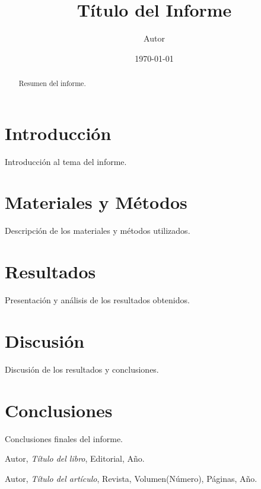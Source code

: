 \documentclass[a4paper,12pt]{article}
\title{Título del Informe}
\author{Autor}
\date{\today}
\begin{document}
\maketitle

\begin{abstract}
    Resumen del informe.
\end{abstract}

\tableofcontents

\section{Introducción}
Introducción al tema del informe.

\section{Materiales y Métodos}
Descripción de los materiales y métodos utilizados.

\section{Resultados}
Presentación y análisis de los resultados obtenidos.

\section{Discusión}
Discusión de los resultados y conclusiones.

\section{Conclusiones}
Conclusiones finales del informe.

\begin{thebibliography}{9}
    Autor, \textit{Título del libro}, Editorial, Año.
    
    Autor, \textit{Título del artículo}, Revista, Volumen(Número), Páginas, Año.
\end{thebibliography}
\end{document}

